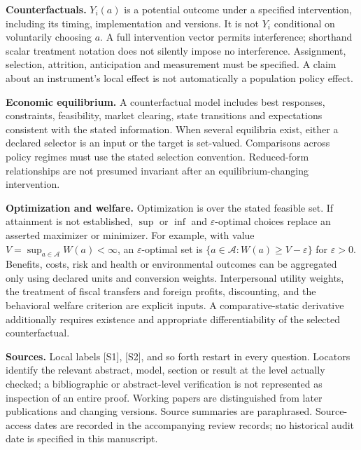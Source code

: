 \documentclass[11pt,a4paper]{article}
\begin{document}
\textbf{Counterfactuals.} $Y_i(a)$ is a potential outcome under a specified intervention, including its timing, implementation and versions. It is not $Y_i$ conditional on voluntarily choosing $a$. A full intervention vector permits interference; shorthand scalar treatment notation does not silently impose no interference. Assignment, selection, attrition, anticipation and measurement must be specified. A claim about an instrument's local effect is not automatically a population policy effect.

\textbf{Economic equilibrium.} A counterfactual model includes best responses, constraints, feasibility, market clearing, state transitions and expectations consistent with the stated information. When several equilibria exist, either a declared selector is an input or the target is set-valued. Comparisons across policy regimes must use the stated selection convention. Reduced-form relationships are not presumed invariant after an equilibrium-changing intervention.

\textbf{Optimization and welfare.} Optimization is over the stated feasible set. If attainment is not established, $\sup$ or $\inf$ and $\varepsilon$-optimal choices replace an asserted maximizer or minimizer. For example, with value $V=\sup_{a\in\mathcal A}W(a)<\infty$, an $\varepsilon$-optimal set is $\{a\in\mathcal A:W(a)\geq V-\varepsilon\}$ for $\varepsilon>0$. Benefits, costs, risk and health or environmental outcomes can be aggregated only using declared units and conversion weights. Interpersonal utility weights, the treatment of fiscal transfers and foreign profits, discounting, and the behavioral welfare criterion are explicit inputs. A comparative-static derivative additionally requires existence and appropriate differentiability of the selected counterfactual.

\textbf{Sources.} Local labels [S1], [S2], and so forth restart in every question. Locators identify the relevant abstract, model, section or result at the level actually checked; a bibliographic or abstract-level verification is not represented as inspection of an entire proof. Working papers are distinguished from later publications and changing versions. Source summaries are paraphrased. Source-access dates are recorded in the accompanying review records; no historical audit date is specified in this manuscript.
\end{document}
